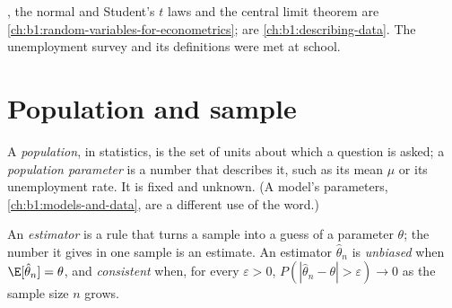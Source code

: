 \begin{recall}
, the normal and Student's $t$ laws and the central
limit theorem are \cref{ch:b1:random-variables-for-econometrics};  are
\cref{ch:b1:describing-data}. The unemployment survey and its definitions were met
at school.
\end{recall}

\section{Population and sample}\label{sec:b1:sampling-and-inference:population}

\begin{definition}\label{def:b1:sampling-and-inference:population}
A \emph{population}, in statistics, is the set of units about which a
question is asked; a \emph{population parameter} is a number that describes it,
such as its mean $\mu$ or its unemployment rate. It is fixed and unknown. (A
model's parameters, \cref{ch:b1:models-and-data}, are a different use of the word.)
\end{definition}

\begin{definition}\label{def:b1:sampling-and-inference:estimator}
An \emph{estimator} is a rule that turns a sample into a guess of a parameter $\theta$;
the number it gives in one sample is an estimate. An estimator $\hat\theta_n$ is
\emph{unbiased} when $\E[\hat\theta_n] = \theta$, and \emph{consistent} when, for every $\varepsilon > 0$,
$P(|\hat\theta_n - \theta| > \varepsilon) \to 0$ as the sample size $n$ grows.
\end{definition}

\begin{center}
\end{center}

